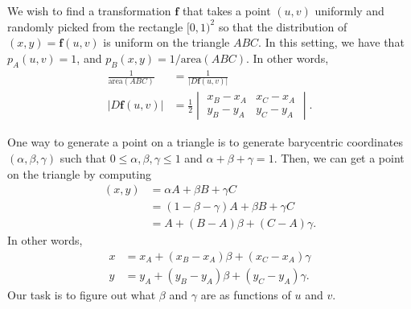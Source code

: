 \documentclass[10pt]{article}
\newcommand{\ve}[1]{\mathbf{#1}}
\begin{document}
  We wish to find a transformation $\ve{f}$ that takes a point $(u,v)$ uniformly and randomly picked from the rectangle $[0,1)^2$ so that the distribution of $(x,y) = \ve{f}(u,v)$ is uniform on the triangle $ABC$.  In this setting, we have that $p_A(u,v) = 1$, and $p_B(x,y) = 1 / \mathrm{area}(ABC)$.  In other words,
  \begin{align*}
    \frac{1}{\mathrm{area}(ABC)} &= \frac{1}{|D\ve{f}(u,v)|} \\
    | D\ve{f}(u,v) | &= \frac{1}{2} \begin{vmatrix}
       x_B - x_A & x_C - x_A \\
       y_B - y_A & y_C - y_A
    \end{vmatrix}.
  \end{align*}

  One way to generate a point on a triangle is to generate barycentric coordinates $(\alpha, \beta, \gamma)$ such that $0 \leq \alpha, \beta, \gamma \leq 1$ and $\alpha + \beta + \gamma = 1$.  Then, we can get a point on the triangle by computing 
  \begin{align*}
    (x,y) 
    &= \alpha A + \beta B + \gamma C \\
    &= (1 - \beta - \gamma) A + \beta B + \gamma C  \\
    &= A + (B - A) \beta + (C - A) \gamma.
  \end{align*}
  In other words,
  \begin{align*}
    x &= x_A + (x_B - x_A)\beta + (x_C - x_A)\gamma \\
    y &= y_A + (y_B - y_A)\beta + (y_C - y_A)\gamma.
  \end{align*}
  Our task is to figure out what $\beta$ and $\gamma$ are as functions of $u$ and $v$.
\end{document}
